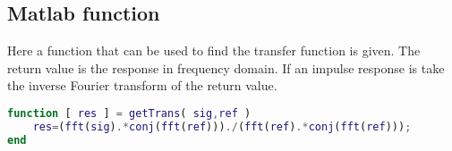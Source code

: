 
 
 \subsection{Matlab function}
 Here a function that can be used to find the transfer function is given. The return value is the response in frequency domain. If an impulse response is take the inverse Fourier transform of the return value. 
 \begin{lstlisting}[language=MATLAB, caption=getTrans.m.]
function [ res ] = getTrans( sig,ref )
	res=(fft(sig).*conj(fft(ref)))./(fft(ref).*conj(fft(ref)));
end
 \end{lstlisting} 
